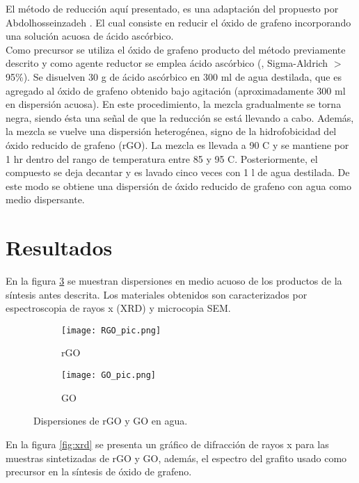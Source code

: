 El método de reducción aquí presentado, es una adaptación del propuesto por Abdolhosseinzadeh \citep{Abdolhosseinzadeh2015}. El cual consiste en reducir el óxido de grafeno incorporando una solución acuosa de ácido ascórbico.
\\
Como precursor se utiliza el óxido de grafeno producto del método previamente descrito y como agente reductor se emplea ácido ascórbico (, Sigma-Aldrich $>$95\%). Se disuelven 30 g de ácido ascórbico en 300 ml de agua destilada, que es agregado al óxido de grafeno obtenido bajo agitación (aproximadamente 300 ml en dispersión acuosa). En este procedimiento, la mezcla gradualmente se torna negra, siendo ésta una señal de que la reducción se está llevando a cabo. Además, la mezcla se vuelve una dispersión heterogénea, signo de la hidrofobicidad del óxido reducido de grafeno (rGO). La mezcla es llevada a 90 \degree C y se mantiene por 1 hr dentro del rango de temperatura entre 85 y 95 \degree C. Posteriormente, el compuesto se deja decantar y es lavado cinco veces con 1 l de agua destilada. De este modo se obtiene una dispersión de óxido reducido de grafeno con agua como medio dispersante.

\section{Resultados}
En la figura \ref{fig:RGOyGO} se muestran dispersiones en medio acuoso de los productos de la síntesis antes descrita.
Los materiales obtenidos son caracterizados por espectroscopia de rayos x (XRD) y microcopia SEM.

\begin{figure}[h]
	\centering
	\begin{subfigure}{0.4\textwidth}
		\texttt{[image: RGO\_pic.png]}
		\caption{rGO}
		\label{fig:RGO}
	\end{subfigure}
	\begin{subfigure}{0.42\textwidth}
		\texttt{[image: GO\_pic.png]}
		\caption{GO}
		\label{fig:GO}
	\end{subfigure}
	\caption{Dispersiones de rGO y GO en agua.}
	\label{fig:RGOyGO}
\end{figure}

En la figura \ref{fig:xrd} se presenta un gráfico de difracción de rayos x para las muestras sintetizadas de rGO y GO, además, el espectro del grafito usado como precursor en la síntesis de óxido de grafeno.

